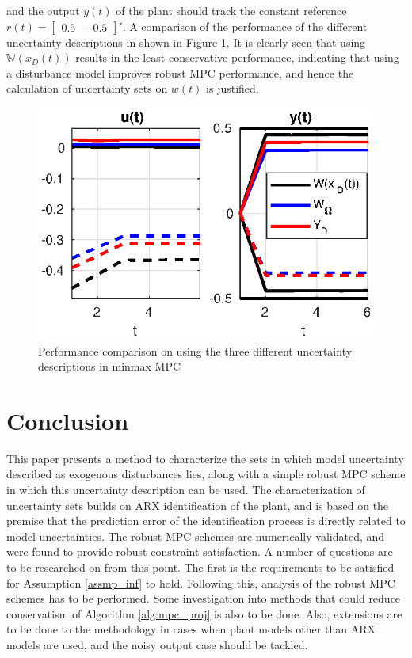 \documentclass[letterpaper, 10 pt, conference]{ieeeconf}  %
\begin{document}
and the output $y(t)$ of the plant should track the constant reference $r(t)=\begin{bmatrix} 0.5 & -0.5 \end{bmatrix} '$. A comparison of the performance of the different uncertainty descriptions in shown in Figure \ref{minmaxMPC}. It is clearly seen that using $\mathbb{W}(x_D(t))$ results in the least conservative performance, indicating that using a disturbance model improves robust MPC performance, and hence the calculation of uncertainty sets on $w(t)$ is justified.
\begin{figure}[h]
	\centering
\includegraphics[scale=0.6]{mimax_full.eps}
\caption{Performance comparison on using the three different uncertainty descriptions in minmax MPC}
\label{minmaxMPC}
\end{figure}
\section{Conclusion}
This paper presents a method to characterize the sets in which model uncertainty described as exogenous disturbances lies, along with a simple robust MPC scheme in which this uncertainty description can be used. The characterization of uncertainty sets builds on ARX identification of the plant, and is based on the premise that the prediction error of the identification process is directly related to model uncertainties. The robust MPC schemes are numerically validated, and were found to provide robust constraint satisfaction. 
A number of questions are to be researched on from this point. The first is the requirements to be satisfied for Assumption \ref{assmp_inf} to hold. Following this, analysis of the robust MPC schemes has to be performed. Some investigation into methods that could reduce conservatism of Algorithm \ref{alg:mpc_proj} is also to be done. Also, extensions are to be done to the methodology in cases when plant models other than ARX models are used, and the noisy output case should be tackled.
\end{document}
